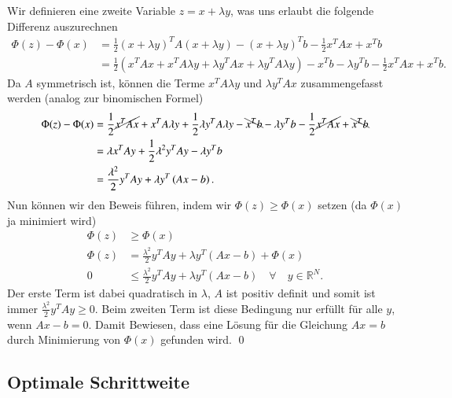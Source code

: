 Wir definieren eine zweite Variable $z = x + \lambda y$, was uns erlaubt die folgende Differenz auszurechnen
\begin{align}
	\Phi(z) - \Phi(x) 
	&= 
	\frac{1}{2} \left(x + \lambda y\right) ^T A \left(x + \lambda y\right)  - \left(x + \lambda y\right) ^T b
	- 
	\frac{1}{2} x^T A x + x^T b 
	\\
	&= 
	\frac{1}{2} \left(x^T A x + x^T A \lambda y + \lambda y^T A x + \lambda y^T A \lambda y\right) 
	-
	x^T b - \lambda y^T b
	- 
	\frac{1}{2} x^T A x + x^T b .	
\end{align}
Da $A$ symmetrisch ist, können die Terme $x^T A \lambda y$ und $\lambda y^T A x$ zusammengefasst werden (analog zur binomischen Formel)
\begin{align}
	\Phi(z) - \Phi(x) 
	&= 
	\frac{1}{2}\cancel{ x^T A x} + x^T A \lambda y + \frac{1}{2} \lambda y^T A \lambda y
	-
	\bcancel{x^T b} - \lambda y^T b
	- 
	\frac{1}{2}\cancel{ x^T A x} + \bcancel{x^T b} \\
	&=
	\lambda x^T A y	+ \frac{1}{2} {\lambda}^2 y^T A y - \lambda y^T b \\
	&=
	\frac{{\lambda}^2}{2} y^T A y + \lambda y^T \left(Ax -b \right) .
\end{align}
Nun können wir den Beweis führen, indem wir $\Phi(z) \ge \Phi(x)$ setzen (da $\Phi(x)$ ja minimiert wird)
\begin{align}
	\Phi(z) &\ge \Phi(x) 
	\\
	\Phi(z) &= \frac{{\lambda}^2}{2} y^T A y + \lambda y^T \left(Ax -b \right) + \Phi(x) 
	\\
	0 &\le \frac{{\lambda}^2}{2} y^T A y + \lambda y^T \left(Ax - b \right) \quad \forall \quad y \in \mathbb{R}^N  .
\end{align}
Der erste Term ist dabei quadratisch in $\lambda$, $A$ ist positiv definit und somit ist immer $\frac{{\lambda}^2}{2} y^T A y \ge 0$.
Beim zweiten Term ist diese Bedingung nur erfüllt für alle $y$, wenn $Ax - b = 0$.
Damit Bewiesen, dass eine Lösung für die Gleichung $Ax = b$ durch Minimierung von $\Phi(x)$ gefunden wird. \qed


\subsection{Optimale Schrittweite \label{cg:subsection:schrittweite}}

